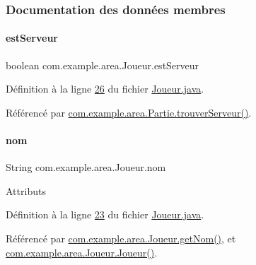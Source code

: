 \subsubsection{Documentation des données membres}
\mbox{\label{classcom_1_1example_1_1area_1_1_joueur_abbc3e85c6740569af7f1bd2cb7aad6a2}} 
\paragraph{\texorpdfstring{est\+Serveur}{estServeur}}
{\footnotesize\ttfamily boolean com.\+example.\+area.\+Joueur.\+est\+Serveur\hspace{0.3cm}{\ttfamily [private]}}



Définition à la ligne \hyperlink{_joueur_8java_source_l00026}{26} du fichier \hyperlink{_joueur_8java_source}{Joueur.\+java}.



Référencé par \hyperlink{_partie_8java_source_l00315}{com.\+example.\+area.\+Partie.\+trouver\+Serveur()}.

\mbox{\label{classcom_1_1example_1_1area_1_1_joueur_a98dde75942f6a48d9acf0abb67742dc3}} 
\paragraph{\texorpdfstring{nom}{nom}}
{\footnotesize\ttfamily String com.\+example.\+area.\+Joueur.\+nom\hspace{0.3cm}{\ttfamily [private]}}

Attributs 

Définition à la ligne \hyperlink{_joueur_8java_source_l00023}{23} du fichier \hyperlink{_joueur_8java_source}{Joueur.\+java}.



Référencé par \hyperlink{_joueur_8java_source_l00039}{com.\+example.\+area.\+Joueur.\+get\+Nom()}, et \hyperlink{_joueur_8java_source_l00028}{com.\+example.\+area.\+Joueur.\+Joueur()}.

